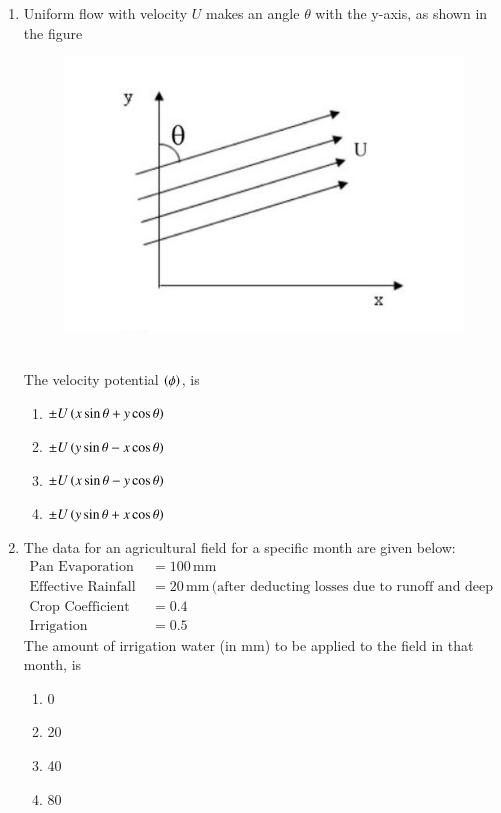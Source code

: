 \documentclass[journal]{IEEEtran}
\begin{document}
\begin{enumerate}
\item Uniform flow with velocity $U$ makes an angle $\theta$ with the y-axis, as shown in the figure 
\begin{figure}[h!]
    \centering
    \includegraphics[width=0.5\linewidth]{figs/graph.png}
    \label{fig:enter-label}
\end{figure}\\
The velocity potential $\left(\phi\right)$, is
\begin{multicols}{2}
    \begin{enumerate}
        \item $\pm U \left(x \sin{\theta} + y \cos{\theta}\right)$
        \item $\pm U \left(y \sin{\theta} - x \cos{\theta}\right)$
        \item $\pm U \left(x \sin{\theta} - y \cos{\theta}\right)$
        \item $\pm U \left(y \sin{\theta} + x \cos{\theta}\right)$
    \end{enumerate}
\end{multicols}

\item The data for an agricultural field for a specific month are given below:
\begin{align*}
    \text{Pan Evaporation} & = 100 \, \text{mm} \\
    \text{Effective Rainfall} & = 20 \, \text{mm} \, \text{(after deducting losses due to runoff and deep percolation)} \\
    \text{Crop Coefficient} & = 0.4 \\
    \text{Irrigation Efficiency} & = 0.5
\end{align*}
The amount of irrigation water (in mm) to be applied to the field in that month, is
\begin{multicols}{2}
    \begin{enumerate}
        \item 0
        \item 20
        \item 40
        \item 80
    \end{enumerate}
\end{multicols}


\end{enumerate}
\end{document}
